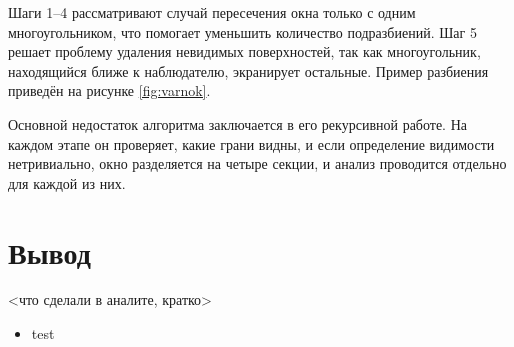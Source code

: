 Шаги 1–4 рассматривают случай пересечения окна только с одним многоугольником, что помогает уменьшить количество подразбиений. Шаг 5 решает проблему удаления невидимых поверхностей, так как многоугольник, находящийся ближе к наблюдателю, экранирует остальные. Пример разбиения приведён на рисунке \ref{fig:varnok}.

Основной недостаток алгоритма заключается в его рекурсивной работе. На каждом этапе он проверяет, какие грани видны, и если определение видимости нетривиально, окно разделяется на четыре секции, и анализ проводится отдельно для каждой из них.

\section*{Вывод}

<что сделали в аналите, кратко>

\begin{itemize}
	\item test
\end{itemize}

\clearpage
